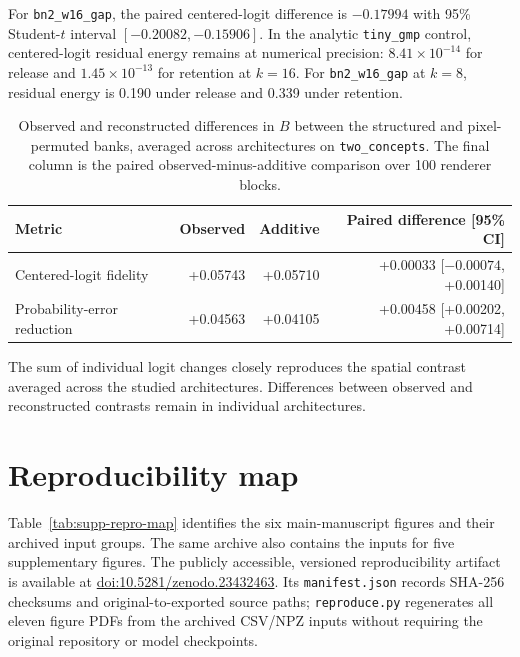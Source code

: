 \documentclass[pdflatex,sn-basic]{sn-jnl}
\begin{document}
For \texttt{bn2\_w16\_gap}, the paired centered-logit difference is $-0.17994$ with 95\% Student-$t$ interval $[-0.20082,-0.15906]$. In the analytic \texttt{tiny\_gmp} control, centered-logit residual energy remains at numerical precision: $8.41\times10^{-14}$ for release and $1.45\times10^{-13}$ for retention at $k=16$. For \texttt{bn2\_w16\_gap} at $k=8$, residual energy is 0.190 under release and 0.339 under retention.

\begin{table}[h]
\caption{Observed and reconstructed differences in $B$ between the structured and pixel-permuted banks, averaged across architectures on \texttt{two\_concepts}. The final column is the paired observed-minus-additive comparison over 100 renderer blocks.}
\label{tab:supp-spatial-additivity}
\centering
\small
\begin{tabular}{lrrr}
\toprule
Metric & Observed & Additive & Paired difference [95\% CI] \\
\midrule
Centered-logit fidelity & +0.05743 & +0.05710 & +0.00033 [$-0.00074$, +0.00140] \\
Probability-error reduction & +0.04563 & +0.04105 & +0.00458 [+0.00202, +0.00714] \\
\bottomrule
\end{tabular}
\end{table}

The sum of individual logit changes closely reproduces the spatial contrast averaged across the studied architectures. Differences between observed and reconstructed contrasts remain in individual architectures.

\section{Reproducibility map}\label{supp:repro-map}

Table~\ref{tab:supp-repro-map} identifies the six main-manuscript figures and their archived input groups. The same archive also contains the inputs for five supplementary figures. The publicly accessible, versioned reproducibility artifact is available at \href{https://doi.org/10.5281/zenodo.23432463}{doi:10.5281/zenodo.23432463}. Its \texttt{manifest.json} records SHA-256 checksums and original-to-exported source paths; \texttt{reproduce.py} regenerates all eleven figure PDFs from the archived CSV/NPZ inputs without requiring the original repository or model checkpoints.
\end{document}
